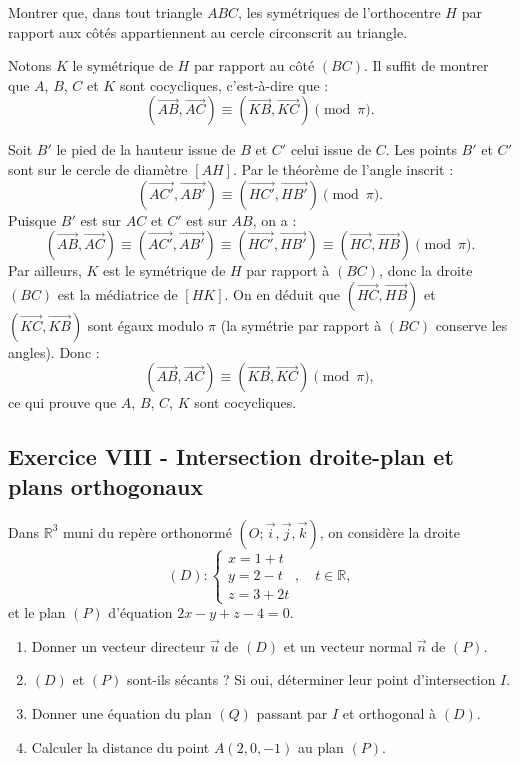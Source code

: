 \documentclass[12pt,a4paper]{article}
\begin{document}
\begin{boiteexercice}
Montrer que, dans tout triangle $ABC$, les symétriques de l'orthocentre $H$ par rapport aux côtés
appartiennent au cercle circonscrit au triangle.
\end{boiteexercice}

\begin{boitecorrige}
Notons $K$ le symétrique de $H$ par rapport au côté $(BC)$. Il suffit de montrer que $A$, $B$, $C$
et $K$ sont cocycliques, c'est-à-dire que :
\[
  (\overrightarrow{AB},\overrightarrow{AC}) \equiv (\overrightarrow{KB},\overrightarrow{KC}) \pmod{\pi}.
\]

Soit $B'$ le pied de la hauteur issue de $B$ et $C'$ celui issue de $C$. Les points $B'$ et $C'$
sont sur le cercle de diamètre $[AH]$. Par le théorème de l'angle inscrit :
\[
  (\overrightarrow{AC'},\overrightarrow{AB'}) \equiv (\overrightarrow{HC'},\overrightarrow{HB'}) \pmod{\pi}.
\]
Puisque $B'$ est sur $AC$ et $C'$ est sur $AB$, on a :
\[
  (\overrightarrow{AB},\overrightarrow{AC}) \equiv (\overrightarrow{AC'},\overrightarrow{AB'})
  \equiv (\overrightarrow{HC'},\overrightarrow{HB'}) \equiv (\overrightarrow{HC},\overrightarrow{HB}) \pmod{\pi}.
\]
Par ailleurs, $K$ est le symétrique de $H$ par rapport à $(BC)$, donc la droite $(BC)$ est la
médiatrice de $[HK]$. On en déduit que $(\overrightarrow{HC},\overrightarrow{HB})$ et
$(\overrightarrow{KC},\overrightarrow{KB})$ sont égaux modulo $\pi$ (la symétrie par rapport à
$(BC)$ conserve les angles). Donc :
\[
  (\overrightarrow{AB},\overrightarrow{AC}) \equiv (\overrightarrow{KB},\overrightarrow{KC}) \pmod{\pi},
\]
ce qui prouve que $A$, $B$, $C$, $K$ sont cocycliques.
\end{boitecorrige}

\subsection*{Exercice VIII - Intersection droite-plan et plans orthogonaux \niveau{\moyen}}

\begin{boiteexercice}
Dans $\mathbb{R}^3$ muni du repère orthonormé $(O;\vec{i},\vec{j},\vec{k})$, on considère la droite
\[
(D) : \begin{cases} x = 1 + t \\ y = 2 - t \\ z = 3 + 2t \end{cases},\quad t\in\mathbb{R},
\]
et le plan $(P)$ d'équation $2x - y + z - 4 = 0$.
\begin{enumerate}
  \item Donner un vecteur directeur $\vec{u}$ de $(D)$ et un vecteur normal $\vec{n}$ de $(P)$.
  \item $(D)$ et $(P)$ sont-ils sécants ? Si oui, déterminer leur point d'intersection $I$.
  \item Donner une équation du plan $(Q)$ passant par $I$ et orthogonal à $(D)$.
  \item Calculer la distance du point $A(2, 0, -1)$ au plan $(P)$.
\end{enumerate}
\end{boiteexercice}
\end{document}
